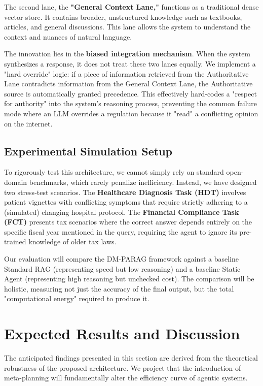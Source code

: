 \documentclass[12pt,en]{elegantpaper}
\begin{document}
The second lane, the \textbf{"General Context Lane,"} functions as a traditional dense vector store. It contains broader, unstructured knowledge such as textbooks, articles, and general discussions. This lane allows the system to understand the context and nuances of natural language.

The innovation lies in the \textbf{biased integration mechanism}. When the system synthesizes a response, it does not treat these two lanes equally. We implement a "hard override" logic: if a piece of information retrieved from the Authoritative Lane contradicts information from the General Context Lane, the Authoritative source is automatically granted precedence. This effectively hard-codes a "respect for authority" into the system's reasoning process, preventing the common failure mode where an LLM overrides a regulation because it "read" a conflicting opinion on the internet.

\subsection{Experimental Simulation Setup}

To rigorously test this architecture, we cannot simply rely on standard open-domain benchmarks, which rarely penalize inefficiency. Instead, we have designed two stress-test scenarios. The \textbf{Healthcare Diagnosis Task (HDT)} involves patient vignettes with conflicting symptoms that require strictly adhering to a (simulated) changing hospital protocol. The \textbf{Financial Compliance Task (FCT)} presents tax scenarios where the correct answer depends entirely on the specific fiscal year mentioned in the query, requiring the agent to ignore its pre-trained knowledge of older tax laws.

Our evaluation will compare the DM-PARAG framework against a baseline Standard RAG (representing speed but low reasoning) and a baseline Static Agent (representing high reasoning but unchecked cost). The comparison will be holistic, measuring not just the accuracy of the final output, but the total "computational energy" required to produce it.

\section{Expected Results and Discussion}

The anticipated findings presented in this section are derived from the theoretical robustness of the proposed architecture. We project that the introduction of meta-planning will fundamentally alter the efficiency curve of agentic systems.
\end{document}
